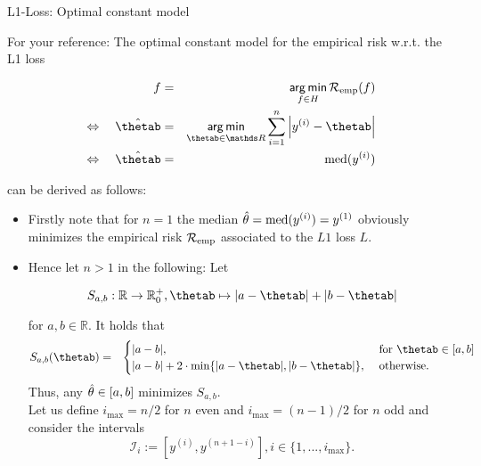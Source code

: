 \begin{vbframe}{L1-Loss: Optimal constant model}


For your reference: The optimal constant model for the empirical risk w.r.t. the L1 loss 

\begin{eqnarray*}
f &=& \argmin_{f \in \Hspace} \riskef\\
\Leftrightarrow \quad \hat \thetab&=& \argmin_{\thetab\in \R} \sum_{i = 1}^n \left|\yi - \thetab\right| \\
\Leftrightarrow \quad \hat \thetab&=& \text{med}(\yi)
\end{eqnarray*}


can be derived as follows: 

\begin{itemize}
  \item Firstly note that for $n = 1$ the median $\hat{\theta} = \text{med}(y^{(i)}) = y^{(1)}$ obviously minimizes the empirical risk $\mathcal{R}_{\text{emp}}$ associated to the $L1$ loss $L$. 


\framebreak


  \item Hence let $n > 1$ in the following: Let 

  $$
    S_{a,b}:\mathbb{R} \rightarrow \mathbb{R}^+_0, \thetab \mapsto |a- \thetab| + |b-\thetab|
  $$

  for $a, b \in \mathbb{R}$. It holds that
  \begin{eqnarray*}
  S_{a,b}(\thetab) &=& \begin{cases}|a-b| ,& \text{ for } \thetab \in [a,b]\\ |a-b| + 2\cdot\min\{|a-\thetab|,|b-\thetab|\}
  ,& \text{ otherwise. }\end{cases}
  \end{eqnarray*}
  Thus, any $\hat{\theta} \in [a,b]$ minimizes $S_{a,b}$. \\

  Let us define $i_{\max} = n / 2$ for $n$ even and $i_{\max} = (n - 1) / 2$ for $n$ odd and consider the intervals 
  $$
    \mathcal{I}_i := [y^{(i)},y^{(n+1-i)}], i \in \{1, ..., i_{\max}\}. 
  $$


\end{itemize}
\end{vbframe}
